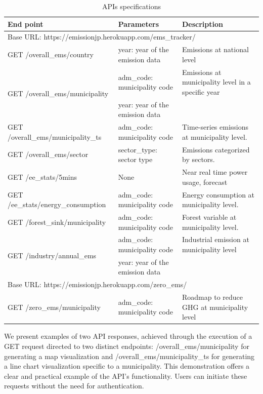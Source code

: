 \begin{table}[!ht]
  \centering
  \caption{APIs specifications}
  \begin{adjustbox}{width=\textwidth}
      \begin{tabular}{lll}
        \hline
        End point & Parameters & Description \\ \hline
        \multicolumn{3}{l}{Base URL: https://emissionjp.herokuapp.com/ems\_tracker/} \\ \hline
        GET /overall\_ems/country  & year: year of the emission data  & Emissions at national level \\ \hline
        \multirow{2}{*}{GET /overall\_ems/municipality}  & adm\_code: municipality code  & Emissions at municipality level in a specific year \\ 
        ~ & year: year of the emission data  & ~ \\ \hline
        GET /overall\_ems/municipality\_ts  & adm\_code: municipality code  & Time-series emissions at municipality level.  \\ \hline
        GET /overall\_ems/sector  & sector\_type: sector type & Emissions categorized by sectors.  \\ \hline
        GET /ee\_stats/5mins  & None & Near real time power usage, forecast \\ \hline
        GET /ee\_stats/energy\_consumption  & adm\_code: municipality code  & Energy consumption at municipality level.  \\ \hline
        GET /forest\_sink/municipality  & adm\_code: municipality code  & Forest variable at municipality level.  \\ \hline
        \multirow{2}{*}{GET /industry/annual\_ems}  & adm\_code: municipality code & Industrial emission at municipality level \\ 
        ~ & year: year of the emission data & ~ \\ \hline
        \multicolumn{3}{l}{Base URL: https://emissionjp.herokuapp.com/zero\_ems/} \\ \hline
        GET /zero\_ems/municipality & adm\_code: municipality code & Roadmap to reduce GHG at municipality level \\ \hline
    \end{tabular}
  \end{adjustbox}
  \label{tab:chap7_tab2}
\end{table}

We present examples of two API responses, achieved through the execution of a GET request directed to two distinct endpoints: /overall\_ems/municipality for generating a map visualization and /overall\_ems/municipality\_ts for generating a line chart visualization specific to a municipality. This demonstration offers a clear and practical example of the API's functionality. Users can initiate these requests without the need for authentication.  \par

